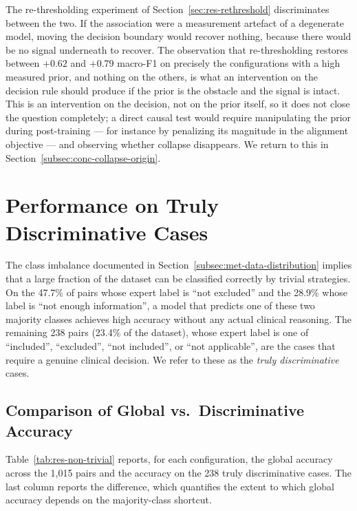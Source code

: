 The re-thresholding experiment of Section~\ref{sec:res-rethreshold} 
discriminates between the two. If the association were a measurement 
artefact of a degenerate model, moving the decision boundary would 
recover nothing, because there would be no signal underneath to recover. 
The observation that re-thresholding restores between $+0.62$ and 
$+0.79$ macro-F1 on precisely the configurations with a high measured 
prior, and nothing on the others, is what an intervention on the 
decision rule should produce if the prior is the obstacle and the signal 
is intact. This is an intervention on the decision, not on the prior 
itself, so it does not close the question completely; a direct causal 
test would require manipulating the prior during post-training --- for 
instance by penalizing its magnitude in the alignment objective --- and 
observing whether collapse disappears. We return to this in 
Section~\ref{subsec:conc-collapse-origin}.
\section{Performance on Truly Discriminative Cases}
\label{sec:res-non-trivial}

The class imbalance documented in Section~\ref{subsec:met-data-distribution} 
implies that a large fraction of the dataset can be classified correctly 
by trivial strategies. On the 47.7\% of pairs whose expert label is 
``not excluded'' and the 28.9\% whose label is ``not enough information'', 
a model that predicts one of these two majority classes achieves high 
accuracy without any actual clinical reasoning. The remaining 238 pairs 
(23.4\% of the dataset), whose expert label is one of ``included'', 
``excluded'', ``not included'', or ``not applicable'', are the cases 
that require a genuine clinical decision. We refer to these as the 
\emph{truly discriminative} cases.

\subsection{Comparison of Global vs.\ Discriminative Accuracy}
\label{subsec:res-non-trivial-comparison}

Table~\ref{tab:res-non-trivial} reports, for each configuration, the 
global accuracy across the 1{,}015 pairs and the accuracy on the 238 
truly discriminative cases. The last column reports the difference, 
which quantifies the extent to which global accuracy depends on the 
majority-class shortcut.

